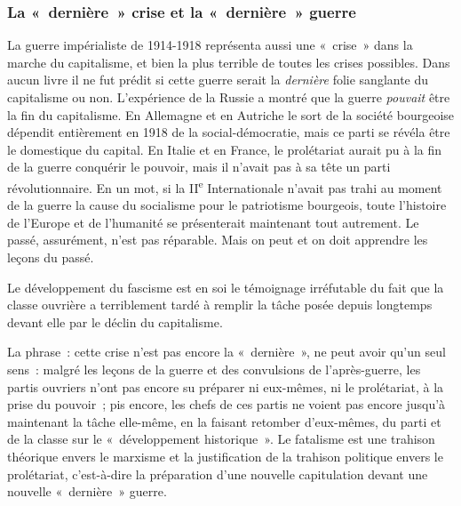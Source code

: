 \documentclass[french,twoside]{book} %
\begin{document}
\subsubsection[{La « dernière » crise et la « dernière » guerre}]{La « dernière » crise et la « dernière » guerre}
\noindent La guerre impérialiste de 1914-1918 représenta aussi une « crise » dans la marche du capitalisme, et bien la  plus terrible de toutes les crises possibles. Dans aucun livre il ne fut prédit si cette guerre serait la \emph{dernière} folie sanglante du capitalisme ou non. L’expérience de la Russie a montré que la guerre \emph{pouvait} être la fin du capitalisme. En Allemagne et en Autriche le sort de la société bourgeoise dépendit entièrement en 1918 de la social-démocratie, mais ce parti se révéla être le domestique du capital. En Italie et en France, le prolétariat aurait pu à la fin de la guerre conquérir le pouvoir, mais il n’avait pas à sa tête un parti révolutionnaire. En un mot, si la II\textsuperscript{e} Internationale n’avait pas trahi au moment de la guerre la cause du socialisme pour le patriotisme bourgeois, toute l’histoire de l’Europe et de l’humanité se présenterait maintenant tout autrement. Le passé, assurément, n’est pas réparable. Mais on peut et on doit apprendre les leçons du passé.\par
Le développement du fascisme est en soi le témoignage irréfutable du fait que la classe ouvrière a terriblement tardé à remplir la tâche posée depuis longtemps devant elle par le déclin du capitalisme.\par
La phrase : cette crise n’est pas encore la « dernière », ne peut avoir qu’un seul sens : malgré les leçons de la guerre et des convulsions de l’après-guerre, les partis ouvriers n’ont pas encore su préparer ni eux-mêmes, ni le prolétariat, à la prise du pouvoir ; pis encore, les chefs de ces partis ne voient pas encore jusqu’à maintenant la tâche elle-même, en la faisant retomber d’eux-mêmes, du parti et de la classe sur le « développement historique ». Le fatalisme est une trahison théorique envers le marxisme et la justification de la trahison politique envers le prolétariat, c’est-à-dire la préparation d’une nouvelle capitulation devant une nouvelle « dernière » guerre.
\end{document}
